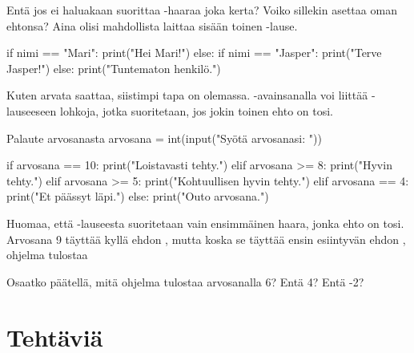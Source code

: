 Entä jos ei haluakaan suorittaa -haaraa joka kerta? Voiko sillekin asettaa oman ehtonsa? Aina olisi mahdollista laittaa sisään toinen -lause.

\begin{python}
if nimi == "Mari":
	print("Hei Mari!")
else:
	if nimi == "Jasper":
		print("Terve Jasper!")
	else:
		print("Tuntematon henkilö.")
\end{python}

Kuten arvata saattaa, siistimpi tapa on olemassa. -avainsanalla voi liittää -lauseeseen lohkoja, jotka suoritetaan, jos jokin toinen ehto on tosi.

\begin{example}{Palaute arvosanasta}
arvosana = int(input("Syötä arvosanasi: "))

if arvosana == 10:
	print("Loistavasti tehty.")
elif arvosana >= 8:
	print("Hyvin tehty.")
elif arvosana >= 5:
	print("Kohtuullisen hyvin tehty.")
elif arvosana == 4:
	print("Et päässyt läpi.")
else:
	print("Outo arvosana.")
\end{example}

Huomaa, että -lauseesta suoritetaan vain ensimmäinen haara, jonka ehto on tosi. Arvosana 9 täyttää kyllä ehdon , mutta koska se täyttää ensin esiintyvän ehdon , ohjelma tulostaa 

Osaatko päätellä, mitä ohjelma tulostaa arvosanalla 6? Entä 4? Entä -2?

\section{Tehtäviä}

